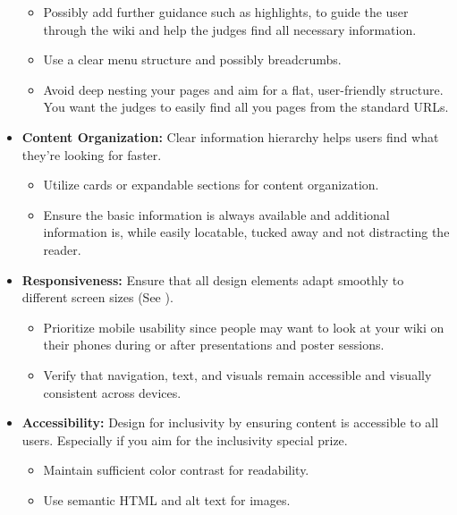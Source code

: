 \begin{itemize}
    \begin{itemize}
        \item Possibly add further guidance such as highlights, to guide the user through the wiki and help the judges find all necessary information.
        \item Use a clear menu structure and possibly breadcrumbs.
        \item Avoid deep nesting your pages and aim for a flat, user-friendly structure.
        You want the judges to easily find all you pages from the standard URLs.
    \end{itemize}
    \item \textbf{Content Organization:} Clear information hierarchy helps users find what they’re looking for faster.
    \begin{itemize}
        \item Utilize cards or expandable sections for content organization.
        \item Ensure the basic information is always available and additional information is, while easily locatable, tucked away and not distracting the reader.
    \end{itemize}
\end{itemize}
\begin{itemize}
    \item \textbf{Responsiveness:} Ensure that all design elements adapt smoothly to different screen sizes (See ).
    \begin{itemize}
        \item Prioritize mobile usability since people may want to look at your wiki on their phones during or after presentations and poster sessions.
        \item Verify that navigation, text, and visuals remain accessible and visually consistent across devices.
    \end{itemize}
    \item \textbf{Accessibility:} Design for inclusivity by ensuring content is accessible to all users.
    Especially if you aim for the inclusivity special prize. 
    \begin{itemize}
        \item Maintain sufficient color contrast for readability.
        \item Use semantic HTML and alt text for images.
    \end{itemize}
\end{itemize}
